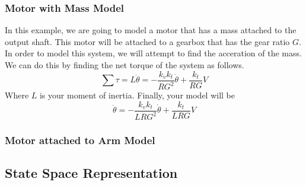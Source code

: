 \documentclass[../main.tex]{subfiles}
\begin{document}
    \subsubsection{Motor with Mass Model}
    In this example, we are going to model a motor that has a mass attached to the output shaft. This 
    motor will be attached to a gearbox that has the gear ratio $G$. In order to model this system,
    we will attempt to find the acceration of the mass. We can do this by finding the net torque of the system
    as follows.
    \begin{equation*}
        \sum \tau = L \ddot \theta = -\frac{k_v k_t}{RG^2} \dot \theta + \frac{k_t}{RG} V
    \end{equation*}
    Where $L$ is your moment of inertia. Finally, your model will be
    \begin{equation*}
        \ddot \theta = -\frac{k_v k_t}{LRG^2} \dot \theta + \frac{k_t}{LRG} V
    \end{equation*}

    \subsubsection{Motor attached to Arm Model}

    \subsection{State Space Representation}
\end{document}
